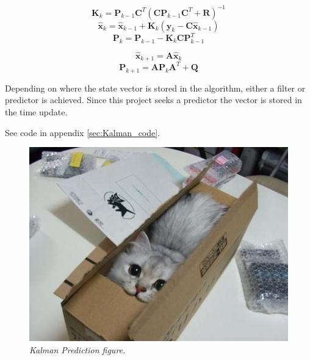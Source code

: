 $$
\textbf{K}_{k} = \textbf{P}_{k-1}\textbf{C}^T(\textbf{C}\textbf{P}_{k-1}\textbf{C}^T + \textbf{R})^{-1}
$$
$$
\hat{\textbf{x}}_k = \hat{\textbf{x}}_{k-1} + \textbf{K}_k (\textbf{y}_k - \textbf{C}\hat{\textbf{x}}_{k-1})
$$
$$
\textbf{P}_k = \textbf{P}_{k-1} - \textbf{K}_k\textbf{C}\textbf{P}_{k-1}^T
$$

$$
\hat{\textbf{x}}_{k+1} = \textbf{A}\hat{\textbf{x}}_{k}
$$
$$
\textbf{P}_{k+1} = \textbf{A}\textbf{P}_{k}\textbf{A}^T + \textbf{Q}
$$

Depending on where the state vector is stored in the algorithm, either a filter or predictor is achieved. Since this project seeks a predictor the vector is stored in the time update.
 
See code in appendix \ref{sec:Kalman_code}. %

\begin{figure}[htb]
	\centering
	\includegraphics[width=\linewidth]{images/acatisfinetoo}
	\caption{\textit{Kalman Prediction figure.}}
	\label{fig:kalman_fig} %
\end{figure}